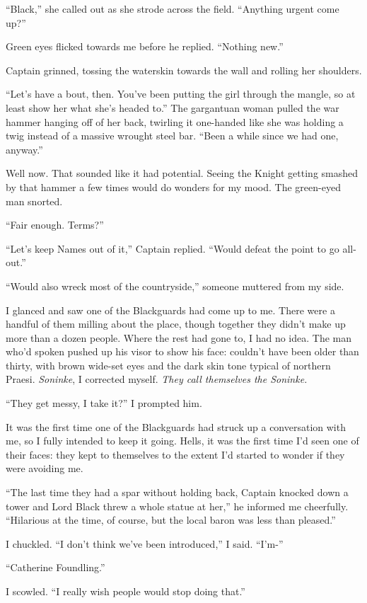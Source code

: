 \documentclass[12pt, openany]{book}
\begin{document}
“Black,” she called out as she strode across the field. “Anything urgent come up?”

Green eyes flicked towards me before he replied. “Nothing new.”

Captain grinned, tossing the waterskin towards the wall and rolling her shoulders.

“Let’s have a bout, then. You’ve been putting the girl through the mangle, so at least show her what she’s headed to.” The gargantuan woman pulled the war hammer hanging off of her back, twirling it one-handed like she was holding a twig instead of a massive wrought steel bar. “Been a while since we had one, anyway.”

Well now. That sounded like it had potential. Seeing the Knight getting smashed by that hammer a few times would do wonders for my mood. The green-eyed man snorted.

“Fair enough. Terms?”

“Let’s keep Names out of it,” Captain replied. “Would defeat the point to go all-out.”

“Would also wreck most of the countryside,” someone muttered from my side.

I glanced and saw one of the Blackguards had come up to me. There were a handful of them milling about the place, though together they didn’t make up more than a dozen people. Where the rest had gone to, I had no idea. The man who’d spoken pushed up his visor to show his face: couldn’t have been older than thirty, with brown wide-set eyes and the dark skin tone typical of northern Praesi. \textit{Soninke}, I corrected myself. \textit{They call themselves the Soninke.}

“They get messy, I take it?” I prompted him.

It was the first time one of the Blackguards had struck up a conversation with me, so I fully intended to keep it going. Hells, it was the first time I’d seen one of their faces: they kept to themselves to the extent I’d started to wonder if they were avoiding me.

“The last time they had a spar without holding back, Captain knocked down a tower and Lord Black threw a whole statue at her,” he informed me cheerfully. “Hilarious at the time, of course, but the local baron was less than pleased.”

I chuckled. “I don’t think we’ve been introduced,” I said. “I’m-”

“Catherine Foundling.”

I scowled. “I really wish people would stop doing that.”
\end{document}
